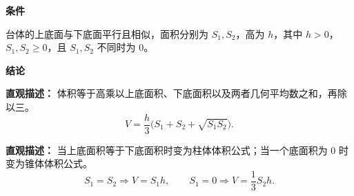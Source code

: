 \begin{statementbox}

	\textbf{\textcolor{CStatement}{条件}}

	\begin{description}[style=nextline, leftmargin=2.8em, labelsep=0.5em, itemsep=0.35em]
		\item[\textbf{\textcolor{CStatement}{条件 1（上下底面平行且相似）：}}]
		      台体的上底面与下底面平行且相似，面积分别为 $S_1,S_2$，高为 $h$，其中 $h>0$，$S_1,S_2\ge 0$，且 $S_1,S_2$ 不同时为 $0$。
	\end{description}

	\medskip

	\textbf{\textcolor{CStatement}{结论}}

	\begin{description}[style=nextline, leftmargin=2.8em, labelsep=0.5em, itemsep=0.45em]
		\item[\textbf{\textcolor{CStatement}{结论一（台体体积公式）：}}]
		      \textbf{\textcolor{CStatement}{直观描述：}}
		      体积等于高乘以上底面积、下底面积以及两者几何平均数之和，再除以三。
		      \[
			      V = \frac{h}{3}\bigl(S_1 + S_2 + \sqrt{S_1S_2}\bigr).
		      \]

		\item[\textbf{\textcolor{CStatement}{推广结论（柱锥退化情形）：}}]
		      \textbf{\textcolor{CStatement}{直观描述：}}
		      当上底面积等于下底面积时变为柱体体积公式；当一个底面积为 $0$ 时变为锥体体积公式。
		      \[
			      S_1 = S_2 \Rightarrow V = S_1h,
			      \qquad
			      S_1 = 0 \Rightarrow V = \frac13 S_2h.
		      \]
	\end{description}

\end{statementbox}
